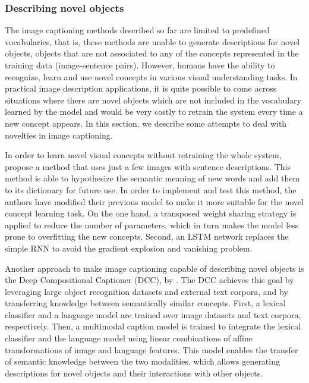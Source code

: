 \subsubsection{Describing novel objects}\label{sec:novel_objects}

The image captioning methods described so far are limited to predefined vocabularies, that is, these methods are unable to generate descriptions for novel objects, objects that are not associated to any of the concepts represented in the training data (image-sentence pairs). However, humans have the ability to recognize, learn and use novel concepts in various visual understanding tasks. In practical image description applications, it is quite possible to come across situations where there are novel objects which are not included in the vocabulary learned by the model and would be very costly to retrain the system every time a new concept appears. In this section, we describe some attempts to deal with novelties in image captioning.

In order to learn novel visual concepts without retraining the whole system, \citet{Mao2015_Child} propose a method that uses just a few images with sentence descriptions. This method is able to hypothesize the semantic meaning of new words and add them to its dictionary for future use. In order to implement and test this method, the authors have modified their previous model \citep{Mao2015_mRNN} to make it more suitable for the novel concept learning task. On the one hand, a transposed weight sharing strategy is applied to reduce the number of parameters, which in turn makes the model less prone to overfitting the new concepts. Second, an LSTM network replaces the simple RNN to avoid the gradient explosion and vanishing problem. 

Another approach to make image captioning capable of describing novel objects is the Deep Compositional Captioner (DCC), by \citet{Hendricks2016}. The DCC achieves this goal by leveraging large object recognition datasets and external text corpora, and by transferring knowledge between semantically similar concepts. First, a lexical classifier and a language model are trained over image datasets and text corpora, respectively. Then, a multimodal caption model is trained to integrate the lexical classifier and the language model using linear combinations of affine transformations of image and language features. This model enables the transfer of semantic knowledge between the two modalities, which allows generating descriptions for novel objects and their interactions with other objects. 

